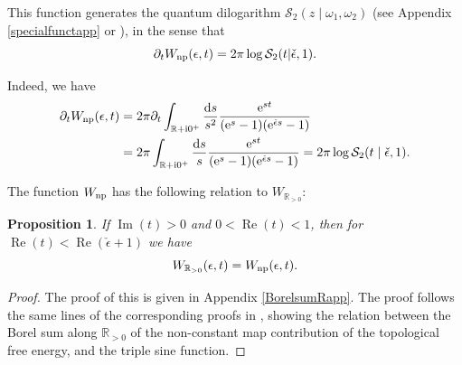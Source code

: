 \documentclass[pdftex]{sigma}
\numberwithin{equation}{section}
\newtheorem{Proposition}[Theorem]{Proposition}
 { \theoremstyle{definition}
\newtheorem{Definition}[Theorem]{Definition}
\newtheorem{Note}[Theorem]{Note}
\newtheorem{Example}[Theorem]{Example}
\newtheorem{Remark}[Theorem]{Remark} }
\begin{document}
This function generates the quantum dilogarithm $\mathcal{S}_2(z\mid \omega_1,\omega_2)$ (see Appendix \ref{specialfunctapp} or \cite{BridgelandCon}), in the sense that
\begin{equation*}%
 \partial_t W_{{\rm np}}(\epsilon,t)=2\pi \log \mathcal{S}_2(t|\check\epsilon,1).
\end{equation*}

Indeed, we have
\begin{align}
 \partial_{t}W_{{\rm np}}(\epsilon,t)& =2\pi \partial_t\int_{\mathbb{R}+\mathrm{i} 0^+}\frac{{\rm d}s}{s^2} \frac{{\rm e}^{st}}{({\rm e}^s-1)({\rm e}^{\check\epsilon s}-1)} \nonumber\\
 & =2\pi \int_{\mathbb{R}+\mathrm{i} 0^+}\frac{{\rm d}s}{s} \frac{{\rm e}^{st}}{({\rm e}^s-1)({\rm e}^{\check\epsilon s}-1)}=2\pi \log \mathcal{S}_2(t\mid \check\epsilon,1).\label{tderWnp}
\end{align}

The function $W_{{\rm np}}$ has the following relation to $W_{\mathbb{R}_{>0}}$:
\begin{Proposition}\label{WRWnp}
If $\operatorname{Im}(t)>0$ and $0<\operatorname{Re}(t)<1$, then for $\operatorname{Re}(t)<\operatorname{Re}(\check\epsilon+1)$ we have
\begin{equation*}
 W_{\mathbb{R}_{>0}}(\epsilon,t)= W_{{\rm np}}(\epsilon,t).
\end{equation*}
\end{Proposition}
\begin{proof}The proof of this is given in Appendix \ref{BorelsumRapp}. The proof follows the same lines of the corresponding proofs in \cite{ASTT21}, showing the relation between the Borel sum along $\mathbb{R}_{>0}$ of the non-constant map contribution of the topological free energy, and the triple sine function.
\end{proof}
\end{document}
